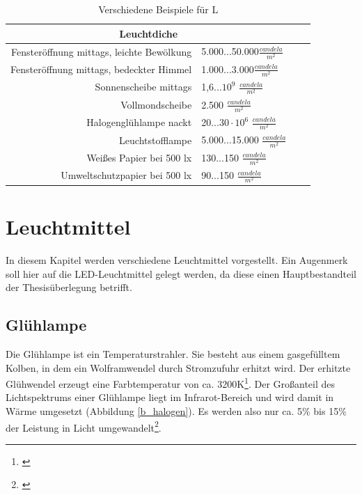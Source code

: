 \begin{table}[htp] 
		\centering
		\begin{tabular}{rlcc}  %
		\toprule
		\multicolumn{2}{c}{\large\sffamily Leuchtdiche}\\ 							
		\midrule
		Fensteröffnung mittags, leichte Bewölkung & 5.000...50.000$\frac{candela}{m^{2}}$\\
		Fensteröffnung mittags, bedeckter Himmel & 1.000...3.000$\frac{candela}{m^{2}}$\\
		Sonnenscheibe mittags & 1,6...$10^{9}$ $\frac{candela}{m^{2}}$\\
		Vollmondscheibe & 2.500 $\frac{candela}{m^{2}}$\\
		Halogenglühlampe nackt & 20...$30 \cdot 10^{6}$ $\frac{candela}{m^{2}}$\\
		Leuchtstofflampe & 5.000...15.000 $\frac{candela}{m^{2}}$\\
		Weißes Papier bei 500 lx & 130...150 $\frac{candela}{m^{2}}$\\
		Umweltschutzpapier bei 500 lx & 90...150 $\frac{candela}{m^{2}}$\\
		\bottomrule
		\end{tabular}
		\caption{Verschiedene Beispiele für L\protect\footnotemark}	
		\label{t_candelamm}
	\end{table}


\chapter{Leuchtmittel}
In diesem Kapitel werden verschiedene Leuchtmittel vorgestellt. Ein Augenmerk soll hier auf die LED-Leuchtmittel gelegt werden, da diese einen Hauptbestandteil der Thesisüberlegung betrifft.


\section{Glühlampe} \label{sec_glühlampe}
Die Glühlampe ist ein Temperaturstrahler. Sie besteht aus einem gasgefülltem Kolben, in dem ein Wolframwendel durch Stromzufuhr erhitzt wird. Der erhitzte Glühwendel erzeugt eine Farbtemperatur von ca. 3200K\footnote{\cite[137]{mueller}}. Der Großanteil des Lichtspektrums einer Glühlampe liegt im Infrarot-Bereich und wird damit in Wärme umgesetzt (Abbildung \ref{b_halogen}). Es werden also nur ca. 5\% bis 15\% der Leistung in Licht umgewandelt\footnote{\cite[78]{ris}}.

